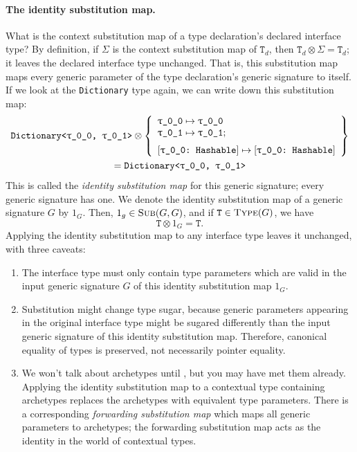 \documentclass[../generics]{subfiles}
\begin{document}
\paragraph{The identity substitution map.}
What is the context substitution map of a type declaration's declared interface type? By definition, if $\Sigma$ is the context substitution map of $\texttt{T}_d$, then $\texttt{T}_d\otimes\Sigma=\texttt{T}_d$; it leaves the declared interface type unchanged. That is, this substitution map maps every generic parameter of the type declaration's generic signature to itself. If we look at the \texttt{Dictionary} type again, we can write down this substitution map:
\begin{multline*}
\texttt{Dictionary<\ttgp{0}{0}, \ttgp{0}{1}>}\otimes
\SubstMapLongC{
\SubstType{\ttgp{0}{0}}{\ttgp{0}{0}}\\
\SubstType{\ttgp{0}{1}}{\ttgp{0}{1}}
}{
\SubstConf{\ttgp{0}{0}}{\ttgp{0}{0}}{Hashable}
}\\
= \texttt{Dictionary<\ttgp{0}{0}, \ttgp{0}{1}>}
\end{multline*}
This is called the \emph{identity substitution map} for this generic signature; every generic signature has one. We denote the identity substitution map of a generic signature $G$ by $1_G$. Then, $1_g\in\textsc{Sub}({G, G})$, and if $\texttt{T}\in\textsc{Type}({G})$, we have
\[\texttt{T} \otimes 1_G = \texttt{T}.\]
Applying the identity substitution map to any interface type leaves it unchanged, with three caveats:
\begin{enumerate}
\item The interface type must only contain type parameters which are valid in the input generic signature $G$ of this identity substitution map $1_G$.
\item Substitution might change type sugar, because generic parameters appearing in the original interface type might be sugared differently than the input generic signature of this identity substitution map. Therefore, canonical equality of types is preserved, not necessarily pointer equality.
\item We won't talk about archetypes until , but you may have met them already. Applying the identity substitution map to a contextual type containing archetypes replaces the archetypes with equivalent type parameters. There is a corresponding \emph{forwarding substitution map} which maps all generic parameters to archetypes; the forwarding substitution map acts as the identity in the world of contextual types.
\end{enumerate}
\end{document}
